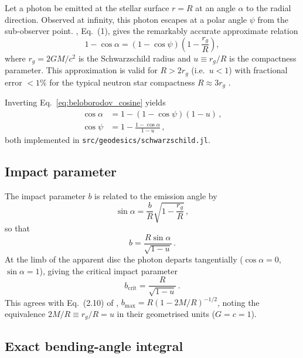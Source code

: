 Let a photon be emitted at the stellar surface $r = R$ at an angle $\alpha$
to the radial direction.  Observed at infinity, this photon escapes at a
polar angle $\psi$ from the sub-observer point.
\citet{beloborodov_2002}, Eq.~(1), gives the remarkably accurate approximate
relation
\begin{equation}
  \boxed{1 - \cos\alpha
    = (1 - \cos\psi)\!\left(1 - \frac{r_g}{R}\right),}
  \label{eq:beloborodov_cosine}
\end{equation}
where $r_g = 2GM/c^{2}$ is the Schwarzschild radius and
$u \equiv r_g/R$ is the compactness parameter.  This approximation is
valid for $R > 2r_g$ (i.e.\ $u < 1$) with fractional error $< 1\%$ for
the typical neutron star compactness $R \approx 3r_g$
\citep[Fig.~2]{beloborodov_2002}.

Inverting Eq.~\eqref{eq:beloborodov_cosine} yields
\begin{align}
  \cos\alpha &= 1 - (1 - \cos\psi)(1 - u)\,,
  \label{eq:cos_alpha} \\
  \cos\psi   &= 1 - \frac{1 - \cos\alpha}{1 - u}\,,
  \label{eq:cos_psi}
\end{align}
both implemented in \texttt{src/geodesics/schwarzschild.jl}.

\subsection{Impact parameter}

The impact parameter $b$ is related to the emission angle by
\citep[Eq.~10]{beloborodov_2002}
\begin{equation}
  \sin\alpha = \frac{b}{R}\sqrt{1 - \frac{r_g}{R}}\,,
  \label{eq:impact_param}
\end{equation}
so that
\begin{equation}
  b = \frac{R\sin\alpha}{\sqrt{1 - u}}\,.
  \label{eq:b_from_alpha}
\end{equation}
At the limb of the apparent disc the photon departs tangentially
($\cos\alpha = 0$, $\sin\alpha = 1$), giving the critical impact parameter
\begin{equation}
  b_{\mathrm{crit}} = \frac{R}{\sqrt{1 - u}}\,.
  \label{eq:b_crit}
\end{equation}
This agrees with Eq.~(2.10) of \citet{pechenick_1983},
$b_{\max} = R(1 - 2M/R)^{-1/2}$, noting the equivalence
$2M/R \equiv r_g/R = u$ in their geometrised units ($G = c = 1$).

\subsection{Exact bending-angle integral}

